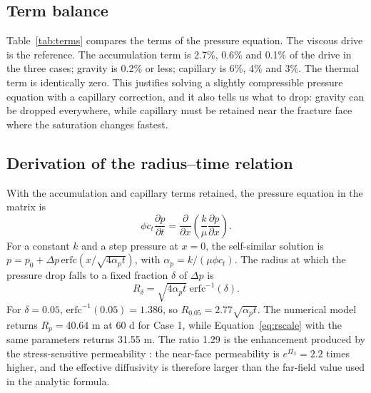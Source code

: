 \documentclass{swmcmthesis}
\begin{document}
\subsection{Term balance}
Table~\ref{tab:terms} compares the terms of the pressure equation. The viscous drive is the reference. The accumulation term is 2.7\%, 0.6\% and 0.1\% of the drive in the three cases; gravity is 0.2\% or less; capillary is 6\%, 4\% and 3\%. The thermal term is identically zero. This justifies solving a slightly compressible pressure equation with a capillary correction, and it also tells us what to drop: gravity can be dropped everywhere, while capillary must be retained near the fracture face where the saturation changes fastest.



\subsection{Derivation of the radius--time relation}
With the accumulation and capillary terms retained, the pressure equation in the matrix is
\begin{equation}
\phi c_t\frac{\partial p}{\partial t}=\frac{\partial}{\partial x}\left(\frac{k}{\mu}\frac{\partial p}{\partial x}\right).
\label{eq:diff}
\end{equation}
For a constant $k$ and a step pressure at $x=0$, the self-similar solution is $p=p_0+\Delta p\,\mathrm{erfc}(x/\sqrt{4\alpha_p t})$, with $\alpha_p=k/(\mu\phi c_t)$. The radius at which the pressure drop falls to a fixed fraction $\delta$ of $\Delta p$ is
\begin{equation}
R_\delta = \sqrt{4\alpha_p t}\;\mathrm{erfc}^{-1}(\delta).
\label{eq:rscale}
\end{equation}
For $\delta=0.05$, $\mathrm{erfc}^{-1}(0.05)=1.386$, so $R_{0.05}=2.77\sqrt{\alpha_p t}$. The numerical model returns $R_p=40.64$ m at 60 d for Case 1, while Equation~\eqref{eq:rscale} with the same parameters returns 31.55 m. The ratio 1.29 is the enhancement produced by the stress-sensitive permeability \cite{davies}: the near-face permeability is $e^{\Pi_3}=2.2$ times higher, and the effective diffusivity is therefore larger than the far-field value used in the analytic formula.
\end{document}
